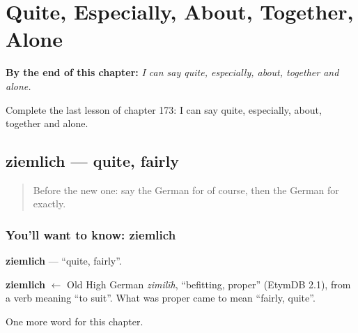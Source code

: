 
\chapter{Quite, Especially, About, Together, Alone}
\label{ch:ge-quite-especially-about-together-alone}

\begin{chapteropening}
\textbf{By the end of this chapter:} \emph{I can say quite, especially, about, together and alone.}

Complete the last lesson of chapter 173: I can say quite, especially, about, together and alone.
\end{chapteropening}

\section[ziemlich]{ziemlich — quite, fairly}

\label{lesson:GE-C173-ziemlich}



\begin{quote}
Before the new one: say the German for of course, then the German for exactly.
\end{quote}

\subsection*{You'll want to know: ziemlich}
\textbf{ziemlich} — \textquotedblleft{}quite, fairly\textquotedblright{}.

\begin{cousinweb}
\textbf{ziemlich} $\leftarrow$ Old High German \emph{zimilīh}, \textquotedblleft{}befitting, proper\textquotedblright{} (EtymDB 2.1), from a verb meaning \textquotedblleft{}to suit\textquotedblright{}. What was proper came to mean \textquotedblleft{}fairly, quite\textquotedblright{}.
\end{cousinweb}

\begin{grammarlens}[title={What you've built}]
One more word for this chapter.
\end{grammarlens}

